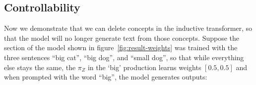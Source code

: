 \documentclass{article}
\begin{document}

\subsection{Controllability}

Now we demonstrate that we can delete concepts in the inductive transformer, so that the model will no longer generate text from those concepts. Suppose the section of the model shown in figure~\ref{fig:result-weights} was trained with the three sentences ``big cat'', ``big dog'', and ``small dog'', so that while everything else stays the same, the $\pi_Z$ in the `big' production learns weights $[0.5, 0.5]$ and when prompted with the word ``big'', the model generates outputs:
\end{document}
